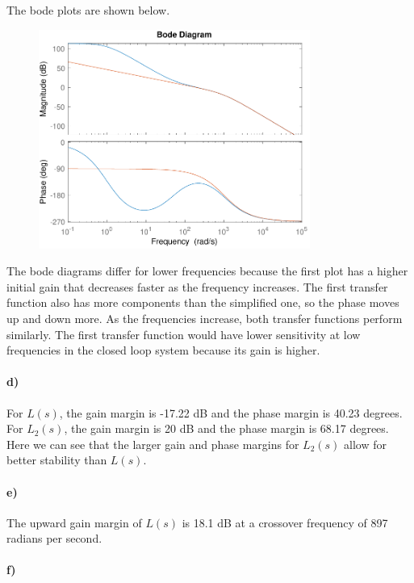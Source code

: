 \documentclass[12pt]{article}
\begin{document}
The bode plots are shown below.
\begin{figure}[H]
    \begin{center}
        \includegraphics[width=3.5in]{problem5c.pdf}
    \end{center}
\end{figure}
The bode diagrams differ for lower frequencies because the first plot has a higher initial gain that decreases
faster as the frequency increases. The first transfer function also has more components than the simplified one,
so the phase moves up and down more. As the frequencies increase, both transfer functions perform similarly. The
first transfer function would have lower sensitivity at low frequencies in the closed loop system because its
gain is higher.

\paragraph{d)}

For \(L(s)\), the gain margin is -17.22 dB and the phase margin is 40.23 degrees. For \(L_2(s)\), the gain margin is
20 dB and the phase margin is 68.17 degrees. Here we can see that the larger gain and phase margins for \(L_2(s)\) allow
for better stability than \(L(s)\).

\paragraph{e)}

The upward gain margin of \(L(s)\) is 18.1 dB at a crossover frequency of 897 radians per second.

\paragraph{f)}
\end{document}
